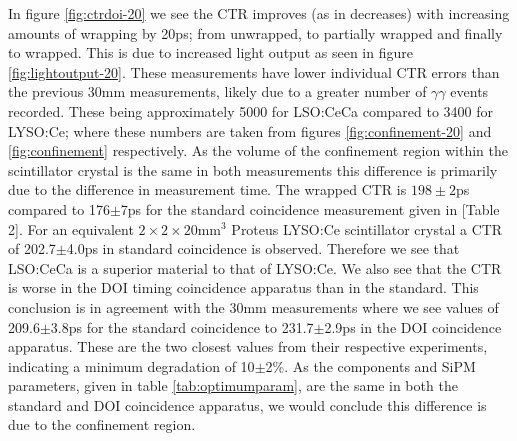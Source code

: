 In figure \ref{fig:ctrdoi-20} we see the CTR improves (as in decreases) with increasing amounts of wrapping by 20ps; from unwrapped, to partially wrapped and finally to wrapped. This is due to increased light output as seen in figure \ref{fig:lightoutput-20}. These measurements have lower individual CTR errors than the previous 30mm measurements, likely due to a greater number of $\gamma\gamma$ events recorded. These being approximately 5000 for LSO:CeCa compared to 3400 for LYSO:Ce; where these numbers are taken from figures \ref{fig:confinement-20} and \ref{fig:confinement} respectively. As the volume of the confinement region within the scintillator crystal is the same in both measurements this difference is primarily due to the difference in measurement time. The wrapped CTR is $198\pm2$ps compared to 176$\pm$7ps for the standard coincidence measurement given in [Table 2]\cite{uffray_Jarron_Meyer_Lecoq_2014}. For an equivalent $2\times2\times20$mm$^3$ Proteus LYSO:Ce scintillator crystal a CTR of 202.7$\pm$4.0ps in standard coincidence is observed. Therefore we see that LSO:CeCa is a superior material to that of LYSO:Ce. We also see that the CTR is worse in the DOI timing coincidence apparatus than in the standard. This conclusion is in agreement with the 30mm measurements where we see values of 209.6$\pm$3.8ps for the standard coincidence to 231.7$\pm$2.9ps in the DOI coincidence apparatus. These are the two closest values from their respective experiments, indicating a minimum degradation of 10$\pm$2\%. As the components and SiPM parameters, given in table \ref{tab:optimumparam}, are the same in both the standard and DOI coincidence apparatus, we would conclude this difference is due to the confinement region.